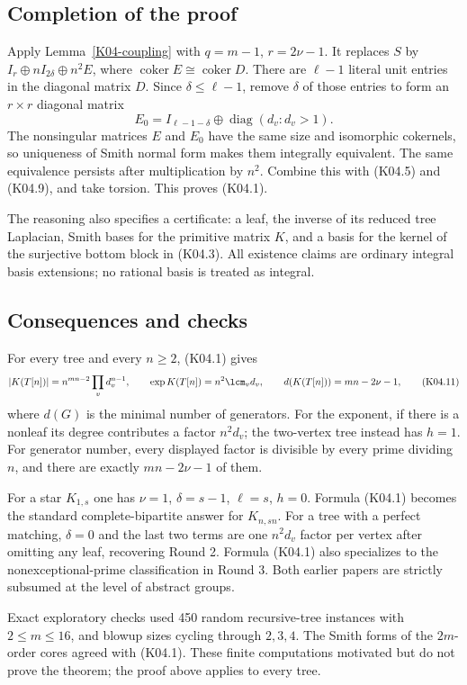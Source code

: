 \documentclass[11pt,a4paper]{article}
\theoremstyle{definition}\newtheorem{definition}[theorem]{Definition}
\theoremstyle{remark}\newtheorem{remark}[theorem]{Remark}
\DeclareMathOperator{\coker}{coker}\DeclareMathOperator{\diag}{diag}\DeclareMathOperator{\rank}{rank}
\numberwithin{equation}{section}
\begin{document}
\subsection{Completion of the proof}\label{K04-sec-5}
Apply Lemma~\ref{K04-coupling} with $q=m-1$, $r=2\nu-1$. It replaces $S$ by $I_r\oplus nI_{2\delta}\oplus n^2E$, where $\coker E\cong\coker D$. There are $\ell-1$ literal unit entries in the diagonal matrix $D$. Since $\delta\leq\ell-1$, remove $\delta$ of those entries to form an $r\times r$ diagonal matrix
\[
 E_0=I_{\ell-1-\delta}\oplus\diag(d_v:d_v>1).
\]
The nonsingular matrices $E$ and $E_0$ have the same size and isomorphic cokernels, so uniqueness of Smith normal form makes them integrally equivalent. The same equivalence persists after multiplication by $n^2$. Combine this with (K04.5) and (K04.9), and take torsion. This proves (K04.1).

The reasoning also specifies a certificate: a leaf, the inverse of its reduced tree Laplacian, Smith bases for the primitive matrix $K$, and a basis for the kernel of the surjective bottom block in (K04.3). All existence claims are ordinary integral basis extensions; no rational basis is treated as integral.

\subsection{Consequences and checks}\label{K04-sec-6}
For every tree and every $n\geq2$, (K04.1) gives
\[
 |K(T[n])|=n^{mn-2}\prod_vd_v^{n-1},\qquad
 \exp K(T[n])=n^2\lcm_vd_v,\qquad
 d(K(T[n]))=mn-2\nu-1,                                      \tag{K04.11}
\]
where $d(G)$ is the minimal number of generators. For the exponent, if there is a nonleaf its degree contributes a factor $n^2d_v$; the two-vertex tree instead has $h=1$. For generator number, every displayed factor is divisible by every prime dividing $n$, and there are exactly $mn-2\nu-1$ of them.

For a star $K_{1,s}$ one has $\nu=1$, $\delta=s-1$, $\ell=s$, $h=0$. Formula (K04.1) becomes the standard complete-bipartite answer for $K_{n,sn}$. For a tree with a perfect matching, $\delta=0$ and the last two terms are one $n^2d_v$ factor per vertex after omitting any leaf, recovering Round 2. Formula (K04.1) also specializes to the nonexceptional-prime classification in Round 3. Both earlier papers are strictly subsumed at the level of abstract groups.

Exact exploratory checks used 450 random recursive-tree instances with $2\leq m\leq16$, and blowup sizes cycling through $2,3,4$. The Smith forms of the $2m$-order cores agreed with (K04.1). These finite computations motivated but do not prove the theorem; the proof above applies to every tree.
\end{document}
